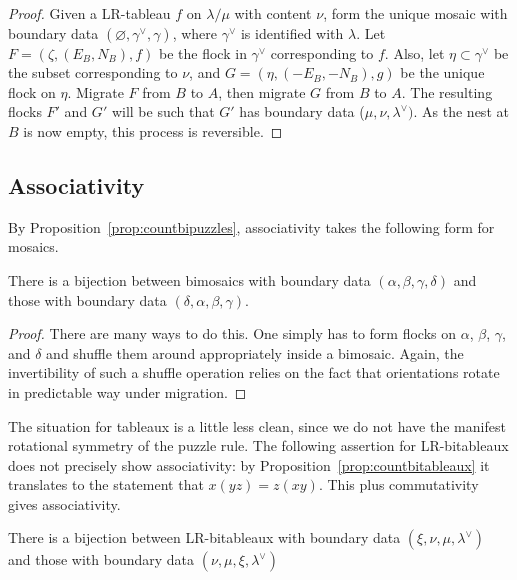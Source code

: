 \begin{proof}
Given a LR-tableau $f$ on $\lambda/\mu$ with content $\nu$,
form the unique mosaic with boundary data $(\varnothing, \gamma^\vee, \gamma)$,
where $\gamma^\vee$ is identified with $\lambda$.  Let
$F = (\zeta, (E_B, N_B), f)$ be the flock in $\gamma^\vee$ corresponding
to $f$.  Also, let $\eta \subset \gamma^\vee$ be the subset corresponding
to $\nu$, and $G = (\eta, (-E_B, -N_B), g)$ be the unique flock on $\eta$.
Migrate $F$ from $B$ to $A$, then migrate $G$ from $B$ to $A$.
The resulting flocks $F'$ and $G'$ will be such that
$G'$ has boundary data ($\mu, \nu, \lambda^\vee)$.  As the nest
at $B$ is now empty, this process is reversible.
\end{proof}

\subsection{Associativity}

By Proposition~\ref{prop:countbipuzzles},
associativity takes the following form for mosaics.
\begin{corollary}
There is a bijection between bimosaics with boundary data
$(\alpha, \beta, \gamma, \delta)$ and those
with boundary data
$(\delta, \alpha, \beta, \gamma)$.
\end{corollary}

\begin{proof}
There are many ways to do this.  One simply has to form flocks
on $\alpha$, $\beta$, $\gamma$, and $\delta$ and shuffle them
around appropriately inside a bimosaic.   Again, the invertibility 
of such a shuffle operation relies on the fact that orientations rotate in 
predictable way under migration.
\end{proof}

The situation for tableaux is a little less clean, since we
do not have the manifest rotational symmetry of the puzzle rule.
The following assertion for LR-bitableaux does not precisely
show associativity: by Proposition~\ref{prop:countbitableaux}
it translates to the statement that
$x(yz) = z(xy)$.  This plus commutativity gives associativity.

\begin{corollary}
\label{cor:tableauassociate}
There is a bijection between LR-bitableaux with boundary
data $(\xi, \nu, \mu, \lambda^\vee)$ and those with boundary data
$(\nu, \mu, \xi, \lambda^\vee)$
\end{corollary}

